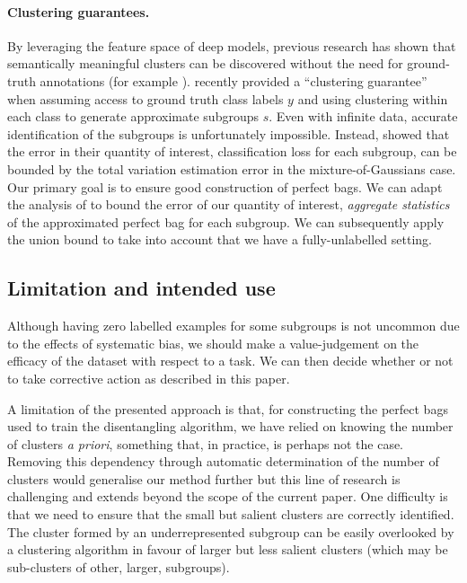 \paragraph{Clustering guarantees.}
By leveraging the feature space of deep models, previous research has shown that semantically meaningful clusters can be discovered without the need for ground-truth annotations
 (for example \citet{RayDunCarRe20,GanVanGeoProetal20,SohDunAngGuetal20,HanRebEhrVedetal20}). 
\citet{SohDunAngGuetal20} recently provided a ``clustering guarantee'' when assuming access to ground truth class labels $y$ and using clustering within each class to generate approximate subgroups $s$.  
%
Even with infinite data, accurate identification of the subgroups is unfortunately impossible. 
%
Instead, \citet{SohDunAngGuetal20} showed that the error in their quantity of interest, classification loss for each subgroup, can be bounded by the total variation estimation error in the mixture-of-Gaussians case.   
%
Our primary goal is to ensure good construction of perfect bags.
We can adapt the analysis of \citet{SohDunAngGuetal20} to bound the error of our quantity of interest, \emph{aggregate statistics} of the approximated perfect bag for each subgroup.
%
We can subsequently apply the union bound to take into account that we have a fully-unlabelled setting.


\subsection{Limitation and intended use}
\label{sec:limitations}
%
Although having zero labelled examples for some subgroups is not uncommon due to the effects of systematic bias,
we should make a value-judgement on the efficacy of the dataset with respect to a task.
%
We can then decide whether or not to take corrective action as described in this paper.

A limitation of the presented approach is that, for constructing the perfect bags used to train the disentangling algorithm, we have relied on knowing the number of clusters \emph{a priori}, something that, in practice, is perhaps not the case. 
%
Removing this dependency through automatic determination of the number of clusters would generalise our method further but this line of research is challenging and extends beyond the scope of the current paper. 
%
One difficulty is that we need to ensure that the small but salient clusters are correctly identified. 
%
The cluster formed by an underrepresented subgroup can be easily overlooked by a clustering algorithm in favour of larger but less salient clusters
(which may be sub-clusters of other, larger, subgroups). 

